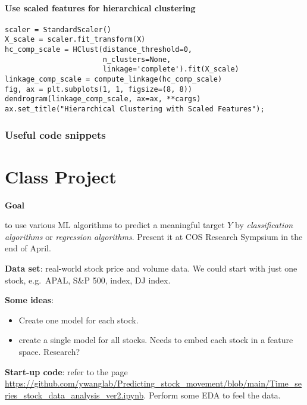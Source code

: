 \documentclass[
  letterpaper,
  DIV=11,
  numbers=noendperiod]{scrreprt}
\providecommand{\tightlist}{%
  \setlength{\itemsep}{0pt}\setlength{\parskip}{0pt}}\usepackage{longtable,booktabs,array}
\begin{document}
\subsubsection{Use scaled features for hierarchical
clustering}\label{use-scaled-features-for-hierarchical-clustering}

\begin{verbatim}
scaler = StandardScaler()
X_scale = scaler.fit_transform(X)
hc_comp_scale = HClust(distance_threshold=0,
                       n_clusters=None,
                       linkage='complete').fit(X_scale)
linkage_comp_scale = compute_linkage(hc_comp_scale)
fig, ax = plt.subplots(1, 1, figsize=(8, 8))
dendrogram(linkage_comp_scale, ax=ax, **cargs)
ax.set_title("Hierarchical Clustering with Scaled Features");
\end{verbatim}

\subsection{Useful code snippets}\label{useful-code-snippets-5}


\chapter{Class Project}\label{class-project}

\textbf{Goal}

to use various ML algorithms to predict a meaningful target \(Y\) by
\emph{classification algorithms} or \emph{regression algorithms}.
Present it at COS Research Sympsium in the end of April.

\textbf{Data set}: real-world stock price and volume data. We could
start with just one stock, e.g.~APAL, S\&P 500, index, DJ index.

\textbf{Some ideas}:

\begin{itemize}
\tightlist
\item
  Create one model for each stock.
\item
  create a single model for all stocks. Needs to embed each stock in a
  feature space. Research?
\end{itemize}

\textbf{Start-up code}: refer to the page
\url{https://github.com/ywanglab/Predicting_stock_movement/blob/main/Time_series_stock_data_analysis_ver2.ipynb}.
Perform some EDA to feel the data.
\end{document}
